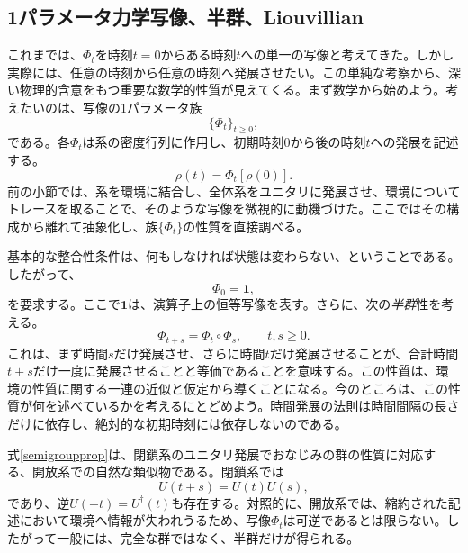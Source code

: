 \documentclass[a4paper,11pt,oneside]{article}
\theoremstyle{definition}
\numberwithin{equation}{section}
\begin{document}
\subsection{1パラメータ力学写像、半群、Liouvillian}



これまでは、$\Phi_t$を時刻$t = 0 $からある時刻$t $への単一の写像と考えてきた。しかし実際には、任意の時刻から任意の時刻へ発展させたい。この単純な考察から、深い物理的含意をもつ重要な数学的性質が見えてくる。まず数学から始めよう。考えたいのは、写像の1パラメータ族
\begin{equation}
\{\Phi_t\}_{t\geq 0},
\end{equation}
である。各$\Phi_t$は系の密度行列に作用し、初期時刻$0$から後の時刻$t$への発展を記述する。
\begin{equation}
\rho(t) = \Phi_t[\rho(0)] .
\end{equation}
前の小節では、系を環境に結合し、全体系をユニタリに発展させ、環境についてトレースを取ることで、そのような写像を微視的に動機づけた。ここではその構成から離れて抽象化し、族$\{\Phi_t\}$の性質を直接調べる。



基本的な整合性条件は、何もしなければ状態は変わらない、ということである。したがって、
\begin{equation}
\Phi_0 = \mathbf{1} ,
\end{equation}
を要求する。ここで$\mathbf{1}$は、演算子上の恒等写像を表す。さらに、次の\textit{半群}性を考える。
\begin{equation}\label{semigroupprop}
\Phi_{t+s} = \Phi_t \circ \Phi_s ,
\qquad
t,s\geq 0 .
\end{equation}
これは、まず時間$s$だけ発展させ、さらに時間$t$だけ発展させることが、合計時間$t+s$だけ一度に発展させることと等価であることを意味する。この性質は、環境の性質に関する一連の近似と仮定から導くことになる。今のところは、この性質が何を述べているかを考えるにとどめよう。時間発展の法則は時間間隔の長さだけに依存し、絶対的な初期時刻には依存しないのである。



式\eqref{semigroupprop}は、閉鎖系のユニタリ発展でおなじみの群の性質に対応する、開放系での自然な類似物である。閉鎖系では
\begin{equation}
U(t+s)=U(t)U(s) ,
\end{equation}
であり、逆$U(-t)=U^\dagger(t)$も存在する。対照的に、開放系では、縮約された記述において環境へ情報が失われうるため、写像$\Phi_t$は可逆であるとは限らない。したがって一般には、完全な群ではなく、半群だけが得られる。
\end{document}
